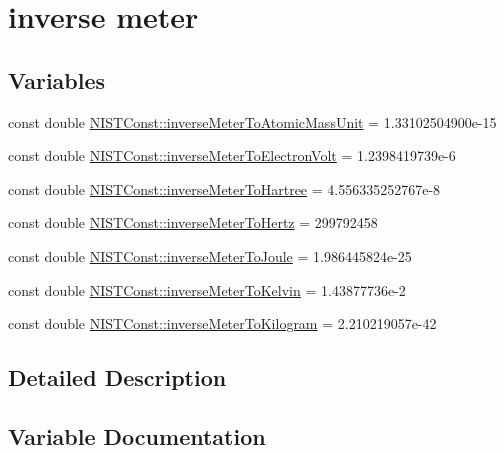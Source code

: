 \hypertarget{group___inverse_meter}{}\section{inverse meter}
\label{group___inverse_meter}
\subsection*{Variables}
\begin{DoxyCompactItemize}
\item 
const double \hyperlink{group___inverse_meter_ga7d76b1c26bd9b6226d0bdbcbfe44c3a0}{N\+I\+S\+T\+Const\+::inverse\+Meter\+To\+Atomic\+Mass\+Unit} = 1.\+33102504900e-\/15
\item 
const double \hyperlink{group___inverse_meter_gafdede27a7699d3a180bb829b65fac447}{N\+I\+S\+T\+Const\+::inverse\+Meter\+To\+Electron\+Volt} = 1.\+2398419739e-\/6
\item 
const double \hyperlink{group___inverse_meter_ga6f47bdfe8997031b0f15229eb5bf4b9e}{N\+I\+S\+T\+Const\+::inverse\+Meter\+To\+Hartree} = 4.\+556335252767e-\/8
\item 
const double \hyperlink{group___inverse_meter_ga5743c27316774c4f065336d0a016508e}{N\+I\+S\+T\+Const\+::inverse\+Meter\+To\+Hertz} = 299792458
\item 
const double \hyperlink{group___inverse_meter_gaa927232a822dccc33f7c56ac002aff52}{N\+I\+S\+T\+Const\+::inverse\+Meter\+To\+Joule} = 1.\+986445824e-\/25
\item 
const double \hyperlink{group___inverse_meter_gaf5a61f53f6757db329df597b76b2df69}{N\+I\+S\+T\+Const\+::inverse\+Meter\+To\+Kelvin} = 1.\+43877736e-\/2
\item 
const double \hyperlink{group___inverse_meter_ga6b5807b2161fa29684e4862e575b9102}{N\+I\+S\+T\+Const\+::inverse\+Meter\+To\+Kilogram} = 2.\+210219057e-\/42
\end{DoxyCompactItemize}


\subsection{Detailed Description}


\subsection{Variable Documentation}
\mbox{\label{group___inverse_meter_ga7d76b1c26bd9b6226d0bdbcbfe44c3a0}} 

